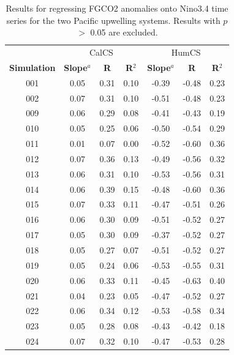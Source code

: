 \documentclass[12pt]{article}
\begin{document}
\newpage
\begin{table}[!h]
	\centering
	\caption{Results for regressing FGCO2 anomalies onto Nino3.4 time series for the two Pacific upwelling systems. Results with $p$ $>$ 0.05 are excluded.}
\begin{tabular}{c c c c | c c c}
	& \multicolumn{3}{c}{CalCS} & \multicolumn{3}{c}{HumCS} \\
	\cmidrule{2-4}\cmidrule{5-7}
	\textbf{Simulation} &  \textbf{Slope}$^{a}$  &  \textbf{R} &  \textbf{R$^{2}$} &  \textbf{Slope}$^{a}$  &  \textbf{R} &  \textbf{R$^{2}$}  \\
	\midrule
	001 &   0.05 &     0.31 &       0.10 &  -0.39 &    -0.48 &       0.23 \\
	002 &   0.07 &     0.31 &       0.10 &  -0.51 &    -0.48 &       0.23 \\
	009 &   0.06 &     0.29 &       0.08 &  -0.41 &    -0.43 &       0.19 \\
	010 &   0.05 &     0.25 &       0.06 &  -0.50 &    -0.54 &       0.29 \\
	011 &   0.01 &     0.07 &       0.00 &  -0.52 &    -0.60 &       0.36 \\
	012 &   0.07 &     0.36 &       0.13 &  -0.49 &    -0.56 &       0.32 \\
	013 &   0.06 &     0.31 &       0.10 &  -0.53 &    -0.56 &       0.31 \\
	014 &   0.06 &     0.39 &       0.15 &  -0.48 &    -0.60 &       0.36 \\
	015 &   0.07 &     0.33 &       0.11 &  -0.47 &    -0.51 &       0.26 \\
	016 &   0.06 &     0.30 &       0.09 &  -0.51 &    -0.52 &       0.27 \\
	017 &   0.05 &     0.30 &       0.09 &  -0.37 &    -0.52 &       0.27 \\
	018 &   0.05 &     0.27 &       0.07 &  -0.51 &    -0.52 &       0.27 \\
	019 &   0.05 &     0.24 &       0.06 &  -0.53 &    -0.55 &       0.31 \\
	020 &   0.06 &     0.33 &       0.11 &  -0.45 &    -0.63 &       0.40 \\
	021 &   0.04 &     0.23 &       0.05 &  -0.47 &    -0.52 &       0.27 \\
	022 &   0.06 &     0.34 &       0.12 &  -0.53 &    -0.58 &       0.34 \\
	023 &   0.05 &     0.28 &       0.08 &  -0.43 &    -0.42 &       0.18 \\
	024 &   0.07 &     0.32 &       0.10 &  -0.47 &    -0.53 &       0.28 \\

\end{tabular}
\end{table}
\end{document}
